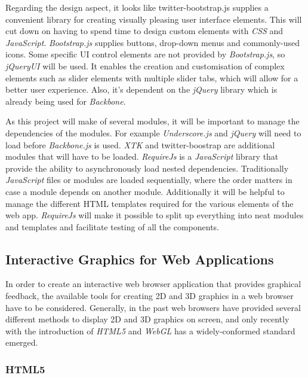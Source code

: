 \documentclass[a4paper,11pt,titlepage]{article}
\begin{document}
Regarding the design aspect, it looks like twitter-bootstrap.js supplies a convenient library for creating visually pleasing user interface elements. This will cut down on having to spend time to design custom elements with \textit{CSS} and \textit{JavaScript}. \textit{Bootstrap.js} supplies buttons, drop-down menus and commonly-used icons. Some specific UI control elements are not provided by \textit{Bootstrap.js}, so \textit{jQueryUI} will be used. It enables the creation and customisation of complex elements such as slider elements with multiple slider tabs, which will allow for a better user experience. Also, it's dependent on the \textit{jQuery} library which is already being used for \textit{Backbone}.

As this project will make of several modules, it will be important to manage the dependencies of the modules. For example \textit{Underscore.js} and \textit{jQuery} will need to load before \textit{Backbone.js} is used. \textit{XTK} and twitter-boostrap are additional modules that will have to be loaded. \textit{RequireJs} is a \textit{JavaScript} library that provide the ability to asynchronously load nested dependencies. Traditionally \textit{JavaScript} files or modules are loaded sequentially, where the order matters in case a module depends on another module. Additionally it will be helpful to manage the different HTML templates required for the various elements of the web app. \textit{RequireJs} will make it possible to split up everything into neat modules and templates and facilitate testing of all the components.



\subsection{Interactive Graphics for Web Applications}

In order to create an interactive web browser application that provides graphical feedback, the available tools for creating 2D and 3D graphics in a web browser have to be considered. Generally, in the past web browsers have provided several different methods to display 2D and 3D graphics on screen, and only recently with the introduction of \textit{HTML5} and \textit{WebGL} has a widely-conformed standard emerged.

\subsubsection{HTML5}
\end{document}
